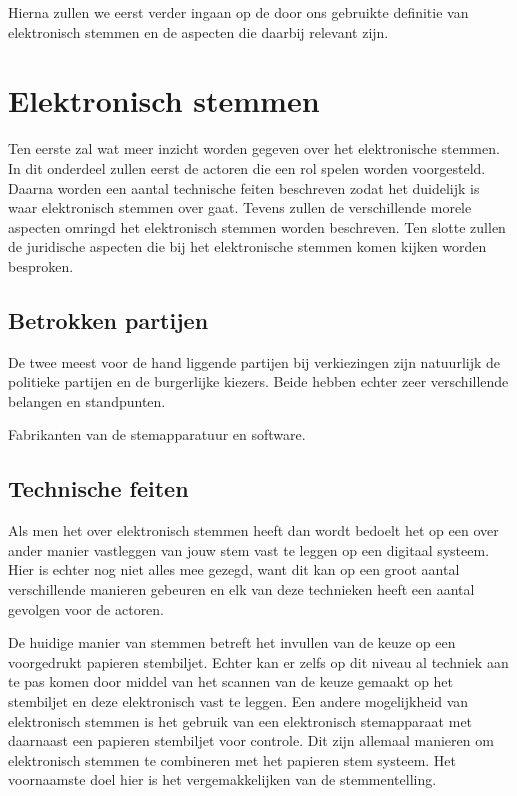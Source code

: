 \documentclass[a4paper]{article}
\begin{document}
Hierna zullen we eerst verder ingaan op de door ons gebruikte definitie van elektronisch stemmen en de aspecten die daarbij relevant zijn.

\section{Elektronisch stemmen}

Ten eerste zal wat meer inzicht worden gegeven over het elektronische stemmen. 
In dit onderdeel zullen eerst de actoren die een rol spelen worden voorgesteld. 
Daarna worden een aantal technische feiten beschreven zodat het duidelijk is waar elektronisch stemmen over gaat.
Tevens zullen de verschillende morele aspecten omringd het elektronisch stemmen worden beschreven.
Ten slotte zullen de juridische aspecten die bij het elektronische stemmen komen kijken worden besproken.

\subsection{Betrokken partijen}

De twee meest voor de hand liggende partijen bij verkiezingen zijn natuurlijk de politieke partijen en de burgerlijke kiezers. 
Beide hebben echter zeer verschillende belangen en standpunten. 

Fabrikanten van de stemapparatuur en software.
 

\subsection{Technische feiten}

Als men het over elektronisch stemmen heeft dan wordt bedoelt het op een over ander manier vastleggen van jouw stem vast te leggen op een digitaal systeem.
Hier is echter nog niet alles mee gezegd, want dit kan op een groot aantal verschillende manieren gebeuren en elk van deze technieken heeft een aantal gevolgen voor de actoren. 

De huidige manier van stemmen betreft het invullen van de keuze op een voorgedrukt papieren stembiljet. 
Echter kan er zelfs op dit niveau al techniek aan te pas komen door middel van het scannen van de keuze gemaakt op het stembiljet en deze elektronisch vast te leggen.
Een andere mogelijkheid van elektronisch stemmen is het gebruik van een elektronisch stemapparaat met daarnaast een papieren stembiljet voor controle.
Dit zijn allemaal manieren om elektronisch stemmen te combineren met het papieren stem systeem.
Het voornaamste doel hier is het vergemakkelijken van de stemmentelling.
\end{document}
